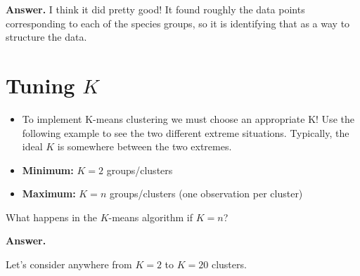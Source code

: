 \documentclass[
  letterpaper,
  DIV=11,
  numbers=noendperiod]{scrartcl}
\newenvironment{Shaded}{\begin{snugshade}}{\end{snugshade}}
\newcommand{\AttributeTok}[1]{\textcolor[rgb]{0.40,0.45,0.13}{#1}}
\newcommand{\DecValTok}[1]{\textcolor[rgb]{0.68,0.00,0.00}{#1}}
\newcommand{\FunctionTok}[1]{\textcolor[rgb]{0.28,0.35,0.67}{#1}}
\newcommand{\NormalTok}[1]{\textcolor[rgb]{0.00,0.23,0.31}{#1}}
\newcommand{\OtherTok}[1]{\textcolor[rgb]{0.00,0.23,0.31}{#1}}
\newcommand{\SpecialCharTok}[1]{\textcolor[rgb]{0.37,0.37,0.37}{#1}}
\newcommand{\StringTok}[1]{\textcolor[rgb]{0.13,0.47,0.30}{#1}}
\begin{document}
\textbf{Answer.} I think it did pretty good! It found roughly the data
points corresponding to each of the species groups, so it is identifying
that as a way to structure the data.

\section{\texorpdfstring{Tuning \(K\)}{Tuning K}}\label{tuning-k}

\begin{itemize}
\item
  To implement K-means clustering we must choose an appropriate K! Use
  the following example to see the two different extreme situations.
  Typically, the ideal \(K\) is somewhere between the two extremes.
\item
  \textbf{Minimum:} \(K = 2\) groups/clusters
\item
  \textbf{Maximum:} \(K = n\) groups/clusters (one observation per
  cluster)
\end{itemize}

What happens in the \(K\)-means algorithm if \(K = n\)?

\textbf{Answer.}

Let's consider anywhere from \(K = 2\) to \(K = 20\) clusters.

\begin{Shaded}
\end{Shaded}
\end{document}
